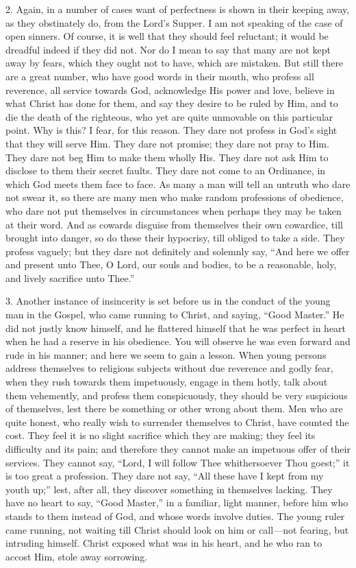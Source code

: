 2. Again, in a number of cases want of perfectness is shown in
their keeping away, as they obstinately do, from the Lord's Supper. I
am not speaking of the case of open sinners. Of course, it is well
that they should feel reluctant; it would be dreadful indeed if they
did not. Nor do I mean to say that many are not kept away by fears,
which they ought not to have, which are mistaken. But still there are
a great number, who have good words in their mouth, who profess all
reverence, all service towards God, acknowledge His power and love,
believe in what Christ has done for them, and say they desire to be
ruled by Him, and to die the death of the righteous, who yet are quite
unmovable on this particular point. Why is this? I fear, for this
reason. They dare not profess in God's sight that they will serve Him.
They dare not promise; they dare not pray to Him. They dare not beg
Him to make them wholly His. They dare not ask Him to disclose to them
their secret faults. They dare not come to an Ordinance, in which God
meets them face to face. As many a man will tell an untruth who dare
not swear it, so there are many men who make random professions of
obedience, who dare not put themselves in circumstances when perhaps
they may be taken at their word. And as cowards disguise from
themselves their own cowardice, till brought into danger, so do these
their hypocrisy, till obliged to take a side. They profess vaguely;
but they dare not definitely and solemnly say, ``And here we offer
and present unto Thee, O Lord, our souls and bodies, to be a
reasonable, holy, and lively sacrifice unto Thee.''

3. Another instance of insincerity is set before us in the conduct
of the young man in the Gospel, who came running to Christ, and
saying, ``Good Master.'' He did not justly know himself, and
he flattered himself that he was perfect in heart when he had a
reserve in his obedience. You will observe he was even forward and
rude in his manner; and here we seem to gain a lesson. When young
persons address themselves to religious subjects without due reverence
and godly fear, when they rush towards them impetuously, engage in
them hotly, talk about them vehemently, and profess them
conspicuously, they should be very suspicious of themselves, lest
there be something or other wrong about them. Men who are quite
honest, who really wish to surrender themselves to Christ, have
counted the cost. They feel it is no slight sacrifice which they are
making; they feel its difficulty and its pain; and therefore they
cannot make an impetuous offer of their services. They cannot say,
``Lord, I will follow Thee whithersoever Thou goest;'' it is
too great a profession. They dare not say, ``All these have I kept
from my youth up;'' lest, after all, they discover something in
themselves lacking. They have no heart to say, ``Good
Master,'' in a familiar, light manner, before him who stands to
them instead of God, and whose words involve duties. The young ruler
came running, not waiting till Christ should look on him or call—not
fearing, but intruding himself. Christ exposed what was in his heart,
and he who ran to accost Him, stole away sorrowing.


